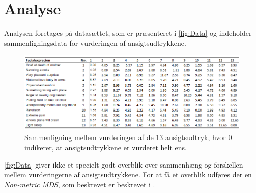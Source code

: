 \section*{Analyse}
\label{Analyse}
%
Analysen foretages på datasættet, som er præsenteret i \autoref{fig:Data} og indeholder sammenligningsdata for vurderingen af ansigtsudtrykkene. 
%
\begin{figure}[H]
\centering
\includegraphics[width = \textwidth]{Figure/Data.PNG} 
\caption{Sammenligning mellem vurderingen af de 13 ansigtsudtryk, hvor 0 indikerer, at ansigtsudtrykkene er vurderet helt ens.}
\label{fig:Data}
\end{figure}
\noindent
%
\autoref{fig:Data} giver ikke et specielt godt overblik over sammenhæng og forskellen mellem vurderingerne af ansigtsudtrykkene. For at få et overblik udføres der en \textit{Non-metric MDS}, som beskrevet er beskrevet i . 

